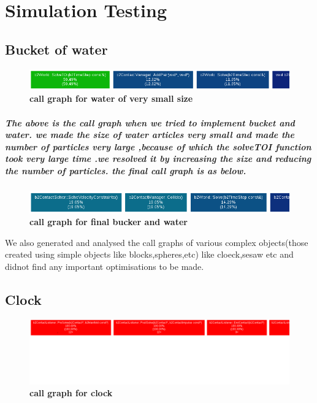 \chapter{Simulation Testing}
\section{Bucket of water}

\begin{figure}[H]
  \centering
    \includegraphics[scale=0.4]{project/images/infi_water.png}
  \caption{\textbf{call graph for water of very small size}}
\end{figure}

\paragraph{
The above is the call graph when we tried to implement bucket and water.
we made the size of water articles very small and made  the number of particles very large ,because of which the solveTOI function took very large time .we resolved it by increasing the size and reducing the number of particles.
the final call graph is as below.
}

\begin{figure}[H]
  \centering
    \includegraphics[scale=0.4]{project/images/normal_water.png}
  \caption{\textbf{call graph for final bucker and water}}
\end{figure}



We also generated and analysed the call graphs of various complex objects(those created using simple objects like blocks,spheres,etc) like cloeck,sesaw etc and didnot find any important optimisations to be made.


\section{Clock}

\begin{figure}[H]
  \centering
    \includegraphics[scale=0.4]{project/images/clock.png}
  \caption{\textbf{call graph for clock}}
\end{figure}

